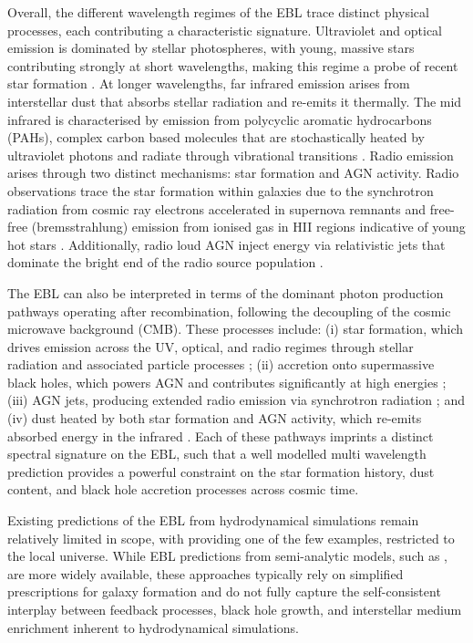\documentclass[
    a4paper, %
    10pt, %
    unnumberedsections, %
]{LTJournalArticle}
\begin{document}
Overall, the different wavelength regimes of the EBL trace distinct physical processes, each contributing a characteristic signature. Ultraviolet and optical emission is dominated by stellar photospheres, with young, massive stars contributing strongly at short wavelengths, making this regime a probe of recent star formation \parencite{kennicuttStarFormationMilky2012}. At longer wavelengths, far infrared emission arises from interstellar dust that absorbs stellar radiation and re-emits it thermally. The mid infrared is characterised by emission from polycyclic aromatic hydrocarbons (PAHs), complex carbon based molecules that are stochastically heated by ultraviolet photons and radiate through vibrational transitions \parencite{peetersPolycyclicAromaticHydrocarbon2023}. Radio emission arises through two distinct mechanisms: star formation and AGN activity. Radio observations trace the star formation within galaxies due to the synchrotron radiation from cosmic ray electrons accelerated in supernova remnants and free-free (bremsstrahlung) emission from ionised gas in HII regions indicative of young hot stars \parencite{kopsacheiliNewXraySupernova2025}. Additionally, radio loud AGN inject energy via relativistic jets that dominate the bright end of the radio source population \parencite{heckmanCoevolutionGalaxiesSupermassive2014}.

The EBL can also be interpreted in terms of the dominant photon production pathways operating after recombination, following the decoupling of the cosmic microwave background (CMB). These processes include: (i) star formation, which drives emission across the UV, optical, and radio regimes through stellar radiation and associated particle processes \parencite{partridgeAreYoungGalaxies1967, tinsleyGalaxyCountsColorredshift1977}; (ii) accretion onto supermassive black holes, which powers AGN and contributes significantly at high energies \parencite{silvaConnectingCosmicInfrared2004, ballantyneContributionActiveGalactic2007}; (iii) AGN jets, producing extended radio emission via synchrotron radiation \parencite{khaireNewSynthesisModels2019}; and (iv) dust heated by both star formation and AGN activity, which re-emits absorbed energy in the infrared \parencite{lagacheDustyInfraredGalaxies2005}. Each of these pathways imprints a distinct spectral signature on the EBL, such that a well modelled multi wavelength prediction provides a powerful constraint on the star formation history, dust content, and black hole accretion processes across cosmic time.

Existing predictions of the EBL from hydrodynamical simulations remain relatively limited in scope, with \cite{baesCosmicSpectralEnergy2019} providing one of the few examples, restricted to the local universe. While EBL predictions from semi-analytic models, such as \cite{gilmoreSemianalyticModelingEBL2012}, are more widely available, these approaches typically rely on simplified prescriptions for galaxy formation and do not fully capture the self-consistent interplay between feedback processes, black hole growth, and interstellar medium enrichment inherent to hydrodynamical simulations.
\end{document}
